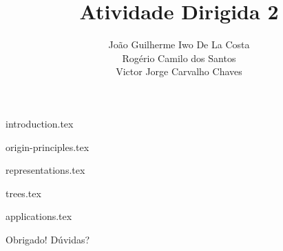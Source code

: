 \documentclass{beamer}
\title{Atividade Dirigida 2}
\author{João Guilherme Iwo De La Costa\\Rogério Camilo dos Santos\\Victor Jorge Carvalho Chaves}
\institute{Conexão dos Garfos}
\begin{document}
\frame{\titlepage}


{introduction.tex}

{origin-principles.tex}

{representations.tex}

{trees.tex}

{applications.tex}

\begin{frame}{Obrigado!}
  \centering
  \Huge Dúvidas?
\end{frame}
\end{document}
